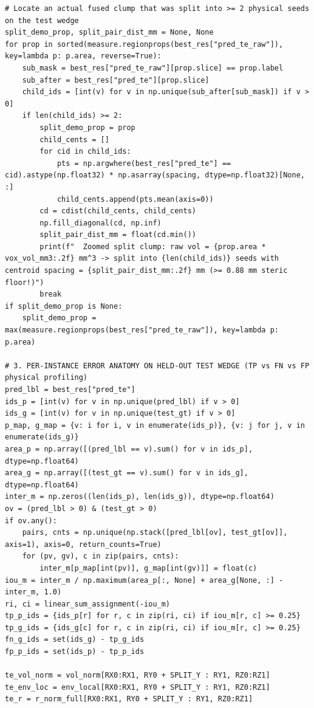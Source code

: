 \documentclass[10pt,a4paper]{article}
\begin{document}
\begin{codebox}
\begin{lstlisting}[style=pybmed]
# Locate an actual fused clump that was split into >= 2 physical seeds on the test wedge
split_demo_prop, split_pair_dist_mm = None, None
for prop in sorted(measure.regionprops(best_res["pred_te_raw"]), key=lambda p: p.area, reverse=True):
    sub_mask = best_res["pred_te_raw"][prop.slice] == prop.label
    sub_after = best_res["pred_te"][prop.slice]
    child_ids = [int(v) for v in np.unique(sub_after[sub_mask]) if v > 0]
    if len(child_ids) >= 2:
        split_demo_prop = prop
        child_cents = []
        for cid in child_ids:
            pts = np.argwhere(best_res["pred_te"] == cid).astype(np.float32) * np.asarray(spacing, dtype=np.float32)[None, :]
            child_cents.append(pts.mean(axis=0))
        cd = cdist(child_cents, child_cents)
        np.fill_diagonal(cd, np.inf)
        split_pair_dist_mm = float(cd.min())
        print(f"  Zoomed split clump: raw vol = {prop.area * vox_vol_mm3:.2f} mm^3 -> split into {len(child_ids)} seeds with centroid spacing = {split_pair_dist_mm:.2f} mm (>= 0.88 mm steric floor!)")
        break
if split_demo_prop is None:
    split_demo_prop = max(measure.regionprops(best_res["pred_te_raw"]), key=lambda p: p.area)

# 3. PER-INSTANCE ERROR ANATOMY ON HELD-OUT TEST WEDGE (TP vs FN vs FP physical profiling)
pred_lbl = best_res["pred_te"]
ids_p = [int(v) for v in np.unique(pred_lbl) if v > 0]
ids_g = [int(v) for v in np.unique(test_gt) if v > 0]
p_map, g_map = {v: i for i, v in enumerate(ids_p)}, {v: j for j, v in enumerate(ids_g)}
area_p = np.array([(pred_lbl == v).sum() for v in ids_p], dtype=np.float64)
area_g = np.array([(test_gt == v).sum() for v in ids_g], dtype=np.float64)
inter_m = np.zeros((len(ids_p), len(ids_g)), dtype=np.float64)
ov = (pred_lbl > 0) & (test_gt > 0)
if ov.any():
    pairs, cnts = np.unique(np.stack([pred_lbl[ov], test_gt[ov]], axis=1), axis=0, return_counts=True)
    for (pv, gv), c in zip(pairs, cnts):
        inter_m[p_map[int(pv)], g_map[int(gv)]] = float(c)
iou_m = inter_m / np.maximum(area_p[:, None] + area_g[None, :] - inter_m, 1.0)
ri, ci = linear_sum_assignment(-iou_m)
tp_p_ids = {ids_p[r] for r, c in zip(ri, ci) if iou_m[r, c] >= 0.25}
tp_g_ids = {ids_g[c] for r, c in zip(ri, ci) if iou_m[r, c] >= 0.25}
fn_g_ids = set(ids_g) - tp_g_ids
fp_p_ids = set(ids_p) - tp_p_ids

te_vol_norm = vol_norm[RX0:RX1, RY0 + SPLIT_Y : RY1, RZ0:RZ1]
te_env_loc = env_local[RX0:RX1, RY0 + SPLIT_Y : RY1, RZ0:RZ1]
te_r = r_norm_full[RX0:RX1, RY0 + SPLIT_Y : RY1, RZ0:RZ1]


\end{lstlisting}
\end{codebox}
\end{document}
